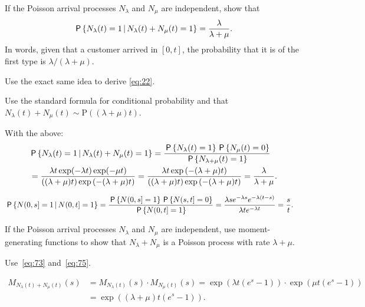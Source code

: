 \documentclass[queueing-book.tex]{subfiles}
\begin{document}
\begin{exercise}\label{ex:30a}
 If the Poisson arrival processes $N_\lambda$ and $N_\mu$ are independent, show that
 \begin{equation*}
 \,\mathsf{P}\left\{N_\lambda(t) = 1 \,\middle|\, N_\lambda(t) + N_\mu(t) = 1\right\} =
\frac{\lambda}{\lambda+\mu}.
 \end{equation*}
In words,  given that a customer arrived in $[0,t]$, the probability that it is of the first type is $\lambda/(\lambda+\mu)$.

Use the exact same idea to derive \cref{eq:22}.
\begin{hint}
Use the standard formula for conditional probability and that $N_\lambda(t) + N_\mu(t) \sim \text{P}((\lambda + \mu)t)$.
\end{hint}
\begin{solution}
 With the above:
 \begin{align*}
& \,\mathsf{P}\left\{N_\lambda(t) = 1 \,\middle|\, N_\lambda(t) + N_\mu(t) = 1\right\}
= \frac{\,\mathsf{P}\left\{N_\lambda(t) = 1\right\}\,\mathsf{P}\left\{N_\mu(t) = 0\right\}}{\,\mathsf{P}\left\{N_{\lambda+\mu}(t) = 1\right\}} \\
&= \frac{\lambda t \exp(-\lambda t) \exp(-\mu t)}{((\lambda+\mu)t)\exp{(-(\lambda+\mu)t)}}
= \frac{\lambda t \exp{(-(\lambda + \mu)t)}}{((\lambda+\mu)t)\exp{(-(\lambda+\mu)t)}}
= \frac{\lambda}{\lambda+\mu}.
 \end{align*}

\begin{align*}
 \,\mathsf{P}\left\{N(0,s] =1\,\middle|\, N(0,t]=1\right\}
&= \frac{\,\mathsf{P}\left\{N(0,s] =1\right\}\,\mathsf{P}\left\{N(s,t]=0\right\}}{\,\mathsf{P}\left\{N(0,t]=1\right\}} = \frac{\lambda s e^{-\lambda s} e^{-\lambda (t-s)}}{\lambda t e^{-\lambda t}} = \frac s t.
\end{align*}
\end{solution}
\end{exercise}


\begin{exercise}\label{ex:41}
 If the Poisson arrival processes $N_\lambda$ and $N_\mu$ are independent, use moment-generating functions to show that $N_\lambda + N_\mu$ is a Poisson process with rate $\lambda + \mu$.
\begin{hint}
 Use~\cref{eq:73} and~\cref{eq:75}.
\end{hint}

\begin{solution}
\begin{align*}
M_{N_\lambda(t)+N_\mu(t)}(s)
&= M_{N_\lambda(t)}(s)\cdot M_{N_{\mu}(t)}(s)
=\exp(\lambda t (e^s -1))\cdot \exp(\mu t(e^s-1)) \\
&= \exp((\lambda + \mu)t (e^s-1)).
\end{align*}
\end{solution}
\end{exercise}
\end{document}
